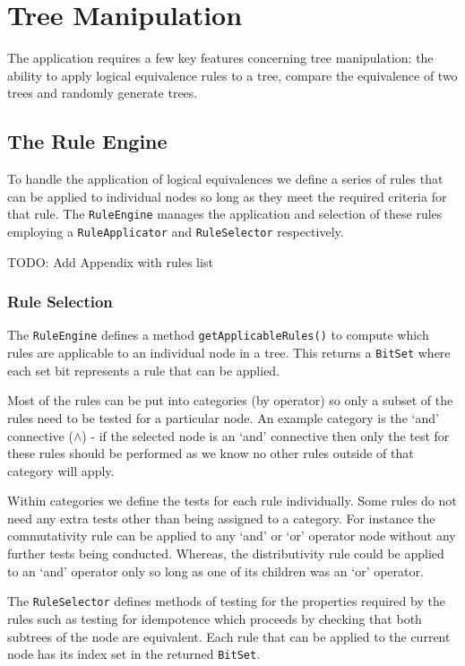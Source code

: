 \documentclass{report}
\begin{document}
\chapter{Tree Manipulation}

The application requires a few key features concerning tree manipulation: the ability to apply logical equivalence rules to a tree, compare the equivalence of two trees and randomly generate trees.

\section{The Rule Engine}
\label{sec:the_rule_engine}

To handle the application of logical equivalences we define a series of rules that can be applied to individual nodes so long as they meet the required criteria for that rule. The {\tt RuleEngine} manages the application and selection of these rules employing a {\tt RuleApplicator} and {\tt RuleSelector} respectively.

TODO: Add Appendix with rules list

\subsection{Rule Selection}
\label{sub:rule_selection}

The {\tt RuleEngine} defines a method {\tt getApplicableRules()} to compute which rules are applicable to an individual node in a tree. This returns a {\tt BitSet} where each set bit represents a rule that can be applied.

Most of the rules can be put into categories (by operator) so only a subset of the rules need to be tested for a particular node. An example category is the `and' connective ($\land$) - if the selected node is an `and' connective then only the test for these rules should be performed as we know no other rules outside of that category will apply.

Within categories we define the tests for each rule individually. Some rules do not need any extra tests other than being assigned to a category. For instance the commutativity rule can be applied to any `and' or `or' operator node without any further tests being conducted. Whereas, the distributivity rule could be applied to an `and' operator only so long as one of its children was an `or' operator.

The {\tt RuleSelector} defines methods of testing for the properties required by the rules such as testing for idempotence which proceeds by checking that both subtrees of the node are equivalent. Each rule that can be applied to the current node has its index set in the returned {\tt BitSet}.
\end{document}
